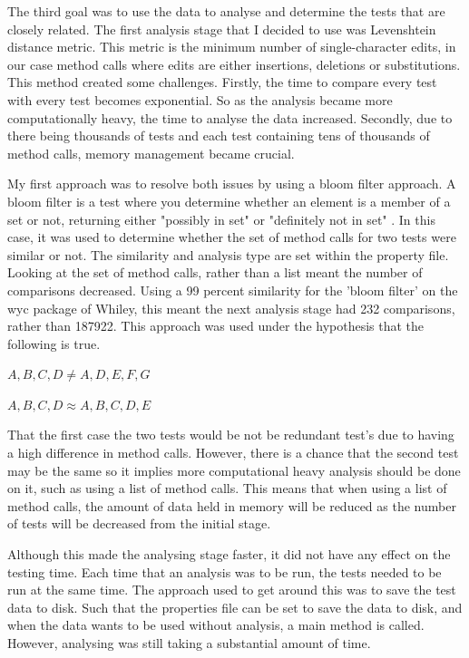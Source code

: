 The third goal was to use the data to analyse and determine the tests that are closely related. The first analysis stage that I decided to use was Levenshtein distance metric. This metric is the minimum number of single-character edits, in our case method calls where edits are either insertions, deletions or substitutions. This method created some challenges. Firstly, the time to compare every test with every test becomes exponential. So as the analysis became more computationally heavy, the time to analyse the data increased. Secondly, due to there being thousands of tests and each test containing tens of thousands of method calls, memory management became crucial. 

My first approach was to resolve both issues by using a bloom filter approach. A bloom filter is a test where you determine whether an element is a member of a set or not, returning either "possibly in set" or "definitely not in set" \cite{bloomfilterwiki}. In this case, it was used to determine whether the set of method calls for two tests were similar or not. The similarity and analysis type are set within the property file. Looking at the set of method calls, rather than a list meant the number of comparisons decreased. Using a 99 percent similarity for the 'bloom filter' on the wyc package of Whiley, this meant the next analysis stage had 232 comparisons, rather than 187922. This approach was used under the hypothesis that the following is true.

$A, B, C, D \neq A, D, E, F, G$

$A, B, C, D \approx A, B, C, D, E$

That the first case the two tests would be not be redundant test’s due to having a high difference in method calls. However, there is a chance that the second test may be the same so it implies more computational heavy analysis should be done on it, such as using a list of method calls. This means that when using a list of method calls, the amount of data held in memory will be reduced as the number of tests will be decreased from the initial stage.

Although this made the analysing stage faster, it did not have any effect on the testing time. Each time that an analysis was to be run, the tests needed to be run at the same time. The approach used to get around this was to save the test data to disk. Such that the properties file can be set to save the data to disk, and when the data wants to be used without analysis, a main method is called. However, analysing was still taking a substantial amount of time. 

